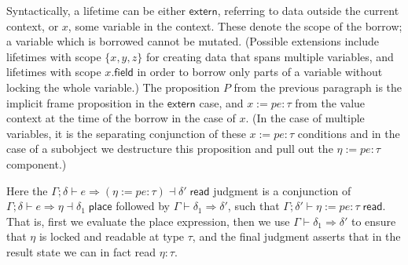 \documentclass[acmsmall,nonacm]{acmart}
\newcommand{\proves}{\vdash}
\newcommand{\makes}{\dashv}
\begin{document}
Syntactically, a lifetime can be either $\mathsf{extern}$, referring to data outside the current context, or $x$, some variable in the context. These denote the scope of the borrow; a variable which is borrowed cannot be mutated. (Possible extensions include lifetimes with scope $\{x,y,z\}$ for creating data that spans multiple variables, and lifetimes with scope $x.\mathsf{field}$ in order to borrow only parts of a variable without locking the whole variable.) The proposition $P$ from the previous paragraph is the implicit frame proposition in the $\mathsf{extern}$ case, and $x:=pe:\tau$ from the value context at the time of the borrow in the case of $x$. (In the case of multiple variables, it is the separating conjunction of these $x:=pe:\tau$ conditions and in the case of a subobject we destructure this proposition and pull out the $\eta:=pe:\tau$ component.)


Here the $\Gamma;\delta \proves e\Rightarrow(\eta:=pe:\tau)\makes\delta'\;\mathsf{read}$ judgment is a conjunction of $\Gamma;\delta \proves e\Rightarrow\eta\makes\delta_1\;\mathsf{place}$ followed by $\Gamma\proves\delta_1 \Rightarrow \delta'$, such that $\Gamma;\delta' \proves \eta:=pe:\tau\;\mathsf{read}$. That is, first we evaluate the place expression, then we use $\Gamma\proves\delta_1 \Rightarrow \delta'$ to ensure that $\eta$ is locked and readable at type $\tau$, and the final judgment asserts that in the result state we can in fact read $\eta:\tau$.
\end{document}
